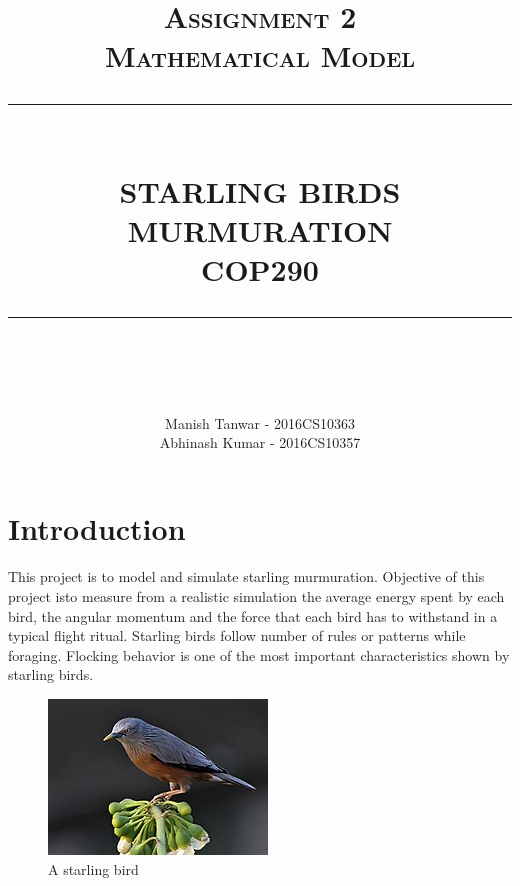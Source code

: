 \documentclass[12pt]{report}
\newcommand{\HRule}[1]{\rule{\linewidth}{#1}}
\begin{document}
\title{ \large \textsc{Assignment 2\\ Mathematical Model
}
		\\ [2.0cm]
		\HRule{1pt} \\
		\LARGE \textbf{\uppercase{STARLING BIRDS MURMURATION}} \\
        \LARGE \textbf{\uppercase{COP290}}
		\HRule{1pt} \\ [0.5cm]
		\normalsize  \vspace*{5\baselineskip}}

\date{}

\author{
		Manish Tanwar 	- 2016CS10363\\ 
        Abhinash Kumar 	- 2016CS10357
		}
\newpage
\maketitle

\sectionfont{\scshape}


\section*{Introduction}
\paragraph*{}
This project is to model and simulate starling murmuration.  Objective of this project isto measure from a realistic simulation the average energy spent by each bird, the angular momentum and the force that each bird has to withstand in a typical flight ritual. Starling birds follow number of rules or patterns while foraging. Flocking behavior is one of the most important characteristics shown by starling birds.

\begin{figure}[h!]
    \centering
    \includegraphics{starling.jpg}
    \caption{A starling bird}
    \label{fig:starling_bird}
\end{figure}
\end{document}
